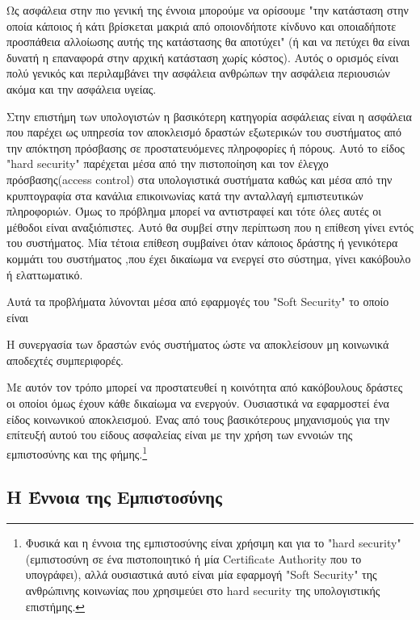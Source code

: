 Ως ασφάλεια στην πιο γενική της έννοια μπορούμε να ορίσουμε "την κατάσταση στην οποία κάποιος ή κάτι βρίσκεται μακριά από οποιονδήποτε κίνδυνο και οποιαδήποτε προσπάθεια αλλοίωσης αυτής της κατάστασης θα αποτύχει" (ή και να πετύχει θα είναι δυνατή η επαναφορά στην αρχική κατάσταση χωρίς κόστος). Αυτός ο ορισμός είναι πολύ γενικός και περιλαμβάνει την ασφάλεια ανθρώπων την ασφάλεια περιουσιών ακόμα και την ασφάλεια υγείας.

Στην επιστήμη των υπολογιστών η βασικότερη κατηγορία ασφάλειας είναι η ασφάλεια που παρέχει ως υπηρεσία τον αποκλεισμό δραστών εξωτερικών του συστήματος από την απόκτηση πρόσβασης σε προστατευόμενες πληροφορίες ή πόρους. Αυτό το είδος "hard security" παρέχεται μέσα από την πιστοποίηση και τον έλεγχο πρόσβασης(access control) στα υπολογιστικά συστήματα καθώς και μέσα από την κρυπτογραφία στα κανάλια επικοινωνίας κατά την ανταλλαγή εμπιστευτικών πληροφοριών. Όμως το πρόβλημα μπορεί να αντιστραφεί και τότε όλες αυτές οι μέθοδοι είναι αναξιόπιστες. Αυτό θα συμβεί στην περίπτωση που η επίθεση γίνει εντός του συστήματος. Μία τέτοια επίθεση συμβαίνει όταν κάποιος δράστης ή γενικότερα κομμάτι του συστήματος ,που έχει δικαίωμα να ενεργεί στο σύστημα, γίνει κακόβουλο ή ελαττωματικό. 

Αυτά τα προβλήματα λύνονται μέσα από εφαρμογές του "Soft Security" το οποίο είναι 

\begin{soft_sec}
Η συνεργασία των δραστών ενός συστήματος ώστε να αποκλείσουν μη κοινωνικά αποδεχτές συμπεριφορές. 
\end{soft_sec}

Με αυτόν τον τρόπο μπορεί να προστατευθεί η κοινότητα από κακόβουλους δράστες οι οποίοι όμως έχουν κάθε δικαίωμα να ενεργούν. Ουσιαστικά να εφαρμοστεί ένα είδος κοινωνικού αποκλεισμού. Ένας από τους βασικότερους μηχανισμούς για την επίτευξή αυτού του είδους ασφαλείας είναι με την χρήση των εννοιών της εμπιστοσύνης και της φήμης.\footnote{Φυσικά και η έννοια της εμπιστοσύνης είναι χρήσιμη και για το "hard security" (εμπιστοσύνη σε ένα πιστοποιητικό ή μία Certificate Authority που το υπογράφει), αλλά ουσιαστικά αυτό είναι μία εφαρμογή "Soft Security" της ανθρώπινης κοινωνίας που χρησιμεύει στο hard security της υπολογιστικής επιστήμης.} 



\subsection{Η Έννοια της Εμπιστοσύνης}

